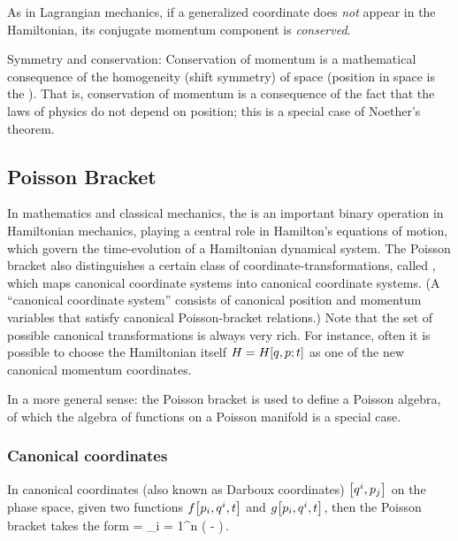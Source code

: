 As in Lagrangian mechanics, if a generalized coordinate does \emph{not} appear in the Hamiltonian, its conjugate momentum component is \emph{conserved}.

Symmetry and conservation: Conservation of momentum is a mathematical consequence of the homogeneity (shift symmetry) of space (position in space is the ). That is, conservation of momentum is a consequence of the fact that the laws of physics do not depend on position; this is a special case of Noether's theorem.


\subsection{Poisson Bracket}
In mathematics and classical mechanics, the  is an important binary operation in Hamiltonian mechanics, playing a central role in Hamilton's equations of motion, which govern the time-evolution of a Hamiltonian dynamical system. The Poisson bracket also distinguishes a certain class of coordinate-transformations, called , which maps canonical coordinate systems into canonical coordinate systems. (A ``canonical coordinate system'' consists of canonical position and momentum variables that satisfy canonical Poisson-bracket relations.) Note that the set of possible canonical transformations is always very rich. For instance, often it is possible to choose the Hamiltonian itself $H = H\!\left[{q,p; t}\right]$ as one of the new canonical momentum coordinates.

In a more general sense: the Poisson bracket is used to define a Poisson algebra, of which the algebra of functions on a Poisson manifold is a special case.


\subsubsection{Canonical coordinates}
In canonical coordinates (also known as Darboux coordinates) $\left[{{q}^{i},{p}_{j}}\right]$ on the phase space, given two functions $f\!\left[{{p}_{i},{q}^{i}, t}\right]$ and $g\!\left[{{p}_{i},{q}^{i}, t}\right]$, then the Poisson bracket takes the form
\beq
{} = \sum_{i = 1}^{n}
                \left(
                    - 
                \right)\,.
\eeq


